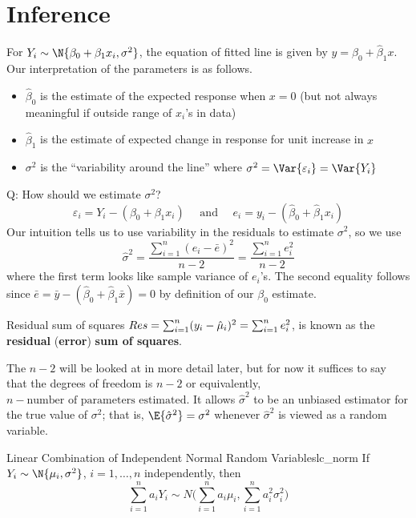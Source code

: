 \section{Inference}
For $ Y_i \sim \N{\beta_0+\beta_1x_i,\sigma^2} $,
the equation of fitted line
is given by $ y=\hat{\beta}_0+\hat{\beta}_1x $. Our
interpretation of the parameters is as follows.
\begin{itemize}
  \item $ \hat{\beta}_0 $ is the estimate
        of the expected response when $ x=0 $ (but not always
        meaningful if outside range of $ x_i $'s in data)
  \item $ \hat{\beta}_1 $ is the estimate of
        expected change in response for unit increase in $ x $
  \item $ \sigma^2 $ is the
        ``variability around the line''
        where $ \sigma^2=\Var{\varepsilon_i}=\Var{Y_i} $
\end{itemize}
Q\@: How should we estimate $ \sigma^2 $?
\[ \varepsilon_i=Y_i-(\beta_0+\beta_1x_i)
  \quad\text{ and }\quad e_i=y_i-(\hat{\beta}_0+\hat{\beta}_1x_i) \]
Our intuition tells us to use variability in the residuals to estimate
$ \sigma^2 $, so we use
\[ \hat{\sigma}^2
  =\frac{\sum_{i=1}^{n} (e_i-\bar{e})^2}{n-2}=
  \frac{\sum_{i=1}^{n} e_i^2}{n-2}  \]
where the first term looks like sample variance of $ e_i $'s.
The second equality follows since
$ \bar{e}=\bar{y}-(\hat{\beta}_0+\hat{\beta}_1\bar{x})=0 $
by definition of our $ \beta_0 $ estimate.
\begin{Definition}{Residual sum of squares}{}
  $ \relax{Res}=
    \sum_{i=1}^{n} (y_i-\hat{\mu}_i)^2=
    \sum_{i=1}^{n} e_i^2 $,
  is known as the \textbf{residual} (\textbf{error})
  \textbf{sum of squares}.
\end{Definition}
\begin{Remark}{}{}
  The $ n-2 $ will be looked at in more detail later, but for now
  it suffices to say that the degrees of freedom
  is $ n-2 $ or equivalently, $ n- \text{number of parameters
      estimated}$. It allows $ \hat{\sigma}^2 $ to be an unbiased estimator
  for the true value of $ \sigma^2 $; that is,
  $ \E{\hat{\sigma}^2}=\sigma^2 $
  whenever $ \hat{\sigma}^2 $ is viewed as a random variable.
\end{Remark}
\begin{Theorem}{Linear Combination of Independent Normal Random Variables}{lc_norm}
  If $ Y_i \sim \N{\mu_i,\sigma^2} $, $ i=1,\ldots,n $
  independently, then
  \[ \sum_{i=1}^{n} a_i Y_i \sim N
    \biggl( \sum_{i=1}^{n} a_i\mu_i,\sum_{i=1}^{n} a_i^2\sigma_i^2 \biggr) \]
\end{Theorem}
